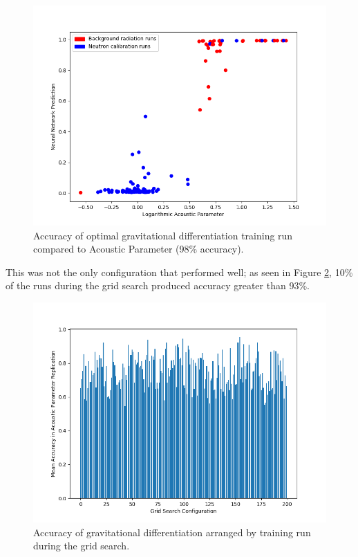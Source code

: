 \documentclass[10pt]{article}
\begin{document}
\begin{figure}[h]
    \centering
    \includegraphics[width=\textwidth]{grav_opt_validation}
    \caption{\label{grav_opt_validation} Accuracy of optimal gravitational differentiation training run compared to Acoustic Parameter (98\% accuracy).}
\end{figure}

This was not the only configuration that performed well; as seen in Figure \ref{grav_acc_by_run}, 10\% of the runs during the grid search produced accuracy greater than 93\%.

\begin{figure}[h]
    \centering
    \includegraphics[width=\textwidth]{grav_acc_by_run}
    \caption{\label{grav_acc_by_run} Accuracy of gravitational differentiation arranged by training run during the grid search.}
\end{figure}
\end{document}
